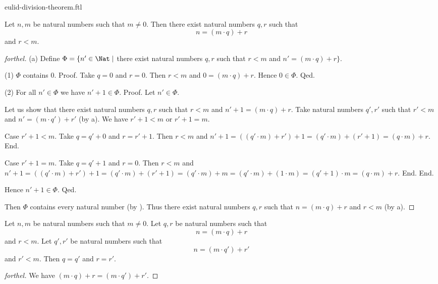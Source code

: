 \documentclass{naproche-library}
\begin{document}
\begin{smodule}[title=Euclid's Division Theorem]{eulid-division-theorem.ftl}

\begin{theorem}[forthel,title=Euclid's Division Theorem: Existence,id=euclid_existence]
  Let $n, m$ be natural numbers such that $m \neq 0$.
  Then there exist natural numbers $q, r$ such that
  \[n = (m \cdot q) + r\]
  and $r < m$.
\end{theorem}
\begin{proof}[forthel]
  (a) Define $\Phi = \{ n' \in \Nat \mid$ there exist natural numbers $q, r$ such that $r < m$ and $n' = (m \cdot q) + r \}$.

  (1) $\Phi$ contains $0$.
  Proof.
    Take $q = 0$ and $r = 0$.
    Then $r < m$ and $0 = (m \cdot q) + r$.
    Hence $0 \in \Phi$.
  Qed.

  (2) For all $n' \in \Phi$ we have $n' + 1 \in \Phi$.
  Proof.
    Let $n' \in \Phi$.

    Let us show that there exist natural numbers $q, r$ such that $r < m$ and $n' + 1 = (m \cdot q) + r$.
      Take natural numbers $q', r'$ such that $r' < m$ and $n' = (m \cdot q') + r'$ (by a).
      We have $r' + 1 < m$ or $r' + 1 = m$.

      Case $r' + 1 < m$.
        Take $q = q' + 0$ and $r = r' + 1$. %
        Then $r < m$ and $n' + 1
          = ((q' \cdot m) + r') + 1
          = (q' \cdot m) + (r' + 1)
          = (q \cdot m) + r$.
      End.

      Case $r' + 1 = m$.
        Take  $q = q' + 1$ and $r = 0$.
        Then $r < m$ and
        $n' + 1
          = ((q' \cdot m) + r') + 1
          = (q' \cdot m) + (r' + 1)
          = (q' \cdot m) + m
          = (q' \cdot m) + (1 \cdot m)
          = (q' + 1) \cdot m
          = (q \cdot m) + r$.
      End.
    End.

    Hence $n' + 1 \in \Phi$.
  Qed.

  Then $\Phi$ contains every natural number (by ).
  Thus there exist natural numbers $q, r$ such that $n = (m \cdot q) + r$ and $r < m$ (by a).
\end{proof}

\begin{theorem}[forthel,title=Euclid's Division Theorem: Uniqueness,id=euclid_uniqueness]
  Let $n, m$ be natural numbers such that $m \neq 0$.
  Let $q, r$ be natural numbers such that
  \[n = (m \cdot q) + r\]
  and $r < m$.
  Let $q', r'$ be natural numbers such that
  \[n = (m \cdot q') + r'\]
  and $r' < m$.
  Then $q = q'$ and $r = r'$.
\end{theorem}
\begin{proof}[forthel]
  We have $(m \cdot q) + r = (m \cdot q') + r'$.


\end{proof}
\end{smodule}
\end{document}
